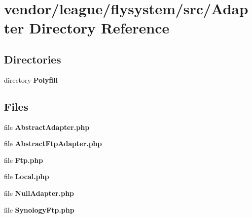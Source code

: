 \section{vendor/league/flysystem/src/\+Adapter Directory Reference}
\label{dir_5b55f5b9568cba52c1019862a70c4c4c}
\subsection*{Directories}
\begin{DoxyCompactItemize}
\item 
directory {\bf Polyfill}
\end{DoxyCompactItemize}
\subsection*{Files}
\begin{DoxyCompactItemize}
\item 
file {\bf Abstract\+Adapter.\+php}
\item 
file {\bf Abstract\+Ftp\+Adapter.\+php}
\item 
file {\bf Ftp.\+php}
\item 
file {\bf Local.\+php}
\item 
file {\bf Null\+Adapter.\+php}
\item 
file {\bf Synology\+Ftp.\+php}
\end{DoxyCompactItemize}
